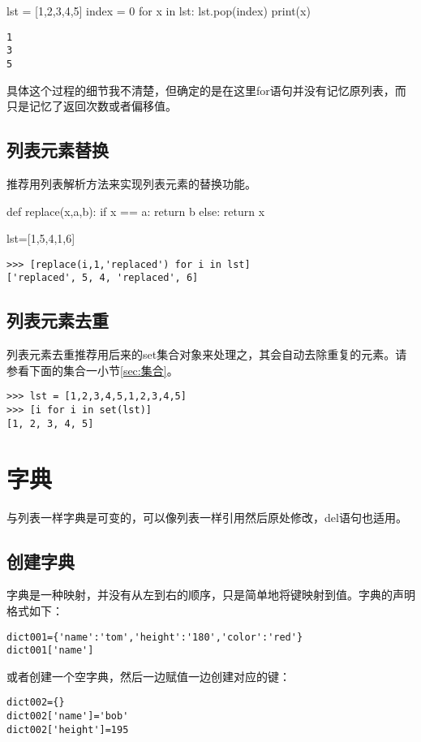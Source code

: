 \documentclass[12pt,oneside]{book}
\begin{document}
\begin{common-format}
\begin{tcbpython}[]
lst = [1,2,3,4,5]
index = 0
for x in lst:
    lst.pop(index)
    print(x)
\end{tcbpython}

\begin{Verbatim}
1
3
5
\end{Verbatim}

具体这个过程的细节我不清楚，但确定的是在这里for语句并没有记忆原列表，而只是记忆了返回次数或者偏移值。

\subsection{列表元素替换}
推荐用列表解析方法来实现列表元素的替换功能。
\begin{tcbpython}[]
def replace(x,a,b):
    if x == a:
        return b
    else:
        return x

lst=[1,5,4,1,6]
\end{tcbpython}
\begin{Verbatim}
>>> [replace(i,1,'replaced') for i in lst]
['replaced', 5, 4, 'replaced', 6]
\end{Verbatim}

\subsection{列表元素去重}
列表元素去重推荐用后来的set集合对象来处理之，其会自动去除重复的元素。请参看下面的集合一小节\ref{sec:集合}。
\begin{Verbatim}
>>> lst = [1,2,3,4,5,1,2,3,4,5]
>>> [i for i in set(lst)]
[1, 2, 3, 4, 5]
\end{Verbatim}


\section{字典}
与列表一样字典是可变的，可以像列表一样引用然后原处修改，del语句也适用。

\subsection{创建字典}
字典是一种映射，并没有从左到右的顺序，只是简单地将键映射到值。字典的声明格式如下：
\begin{Verbatim}
dict001={'name':'tom','height':'180','color':'red'}
dict001['name']
\end{Verbatim}

或者创建一个空字典，然后一边赋值一边创建对应的键：
\begin{Verbatim}
dict002={}
dict002['name']='bob'
dict002['height']=195
\end{Verbatim}


\end{common-format}
\end{document}
